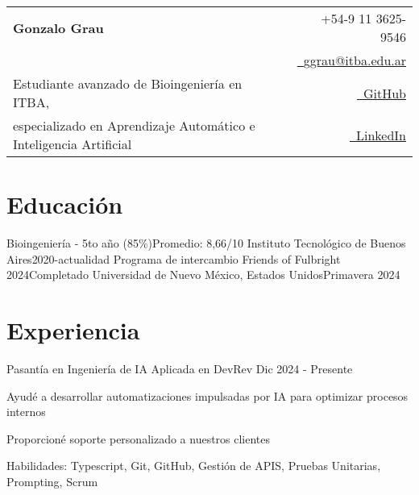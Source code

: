 \documentclass{resume}
\makeatletter
\newcommand{\name}{Gonzalo Grau} %
\renewcommand{\phone}{9 11 3625-9546} %
\newcommand{\emaila}{ggrau@itba.edu.ar} %
\makeatother
\begin{document}
    \selectfont

    {
        \begin{tabularx}{\linewidth}{L r}
            \\
            \textbf{\Huge \name} & {\raisebox{0.0\height}{\footnotesize \faPhone}\ +54-\phone}\\
            & \href{mailto:\emaila}{\raisebox{0.0\height}{\footnotesize \faEnvelope}\ {\emaila}} \\
            Estudiante avanzado de Bioingeniería en ITBA, &
            \href{https://github.com/gonzagrau}{\raisebox{0.0\height}{\footnotesize \faGithub}\ {GitHub}} \\
            especializado en Aprendizaje Automático e Inteligencia Artificial &
            \href{https://www.linkedin.com/in/gonzalo-grau/}
            {\raisebox{0.0\height}{\footnotesize \faLinkedin}\ {LinkedIn}}
        \end{tabularx}
    }




    \section{\textbf{Educación}} \label{sec:education}
    \resumeSubHeadingListStart
    \resumeSubheading
    {Bioingeniería - 5to año (85\%)}{Promedio: 8,66/10}
    {Instituto Tecnológico de Buenos Aires}{2020-actualidad}
    \resumeSubheading
    {Programa de intercambio Friends of Fulbright 2024}{Completado}
    {Universidad de Nuevo México, Estados Unidos}{Primavera 2024}

    \resumeSubHeadingListEnd

    \vspace{-5mm}


    \section{\textbf{Experiencia}} \label{sec:experience}
    \resumeSubHeadingListStart
    \resumeSubheading
    {Pasantía en Ingeniería de IA Aplicada en DevRev}
    {}{}{Dic 2024 - Presente}
    \vspace{-5mm}
    \resumeItemListStart
    \item
    {Ayudé a desarrollar automatizaciones impulsadas por IA para optimizar procesos internos}
    \item {Proporcioné soporte personalizado a nuestros clientes}
    \item{Habilidades: Typescript, Git, GitHub, Gestión de APIS, Pruebas Unitarias, Prompting, Scrum}
    \resumeItemListEnd
\end{document}
